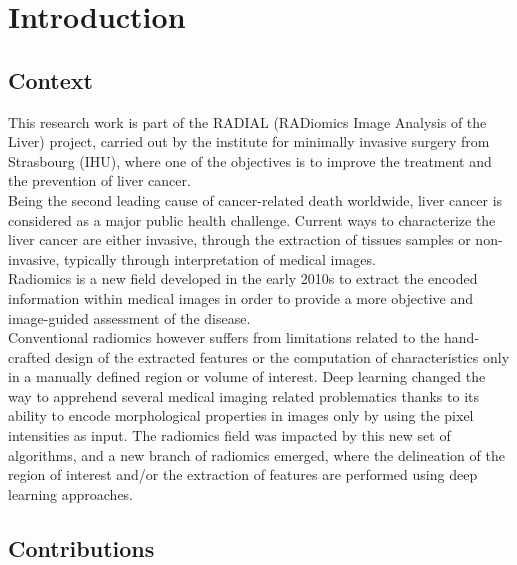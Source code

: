 \chapter*{Introduction}
\label{cha:Introduction}

\section*{Context}
\label{sec:Context}

This research work is part of the RADIAL (RADiomics Image Analysis of the Liver) project, carried out by the
institute for minimally invasive surgery from Strasbourg (IHU), where
one of the objectives is to improve the treatment and the prevention of
liver cancer.\\
Being the second leading cause of cancer-related death worldwide, liver
cancer is considered as a major public health challenge. Current ways to characterize the liver cancer are either invasive, 
through the extraction of tissues samples or non-invasive, typically 
through interpretation of medical images.\\
Radiomics is a new field developed in the early 2010s to extract the encoded information within medical images in order to provide a more objective and image-guided assessment of the disease.\\
Conventional radiomics however suffers from limitations related to the hand-crafted design of the extracted features or the computation of characteristics only in a manually defined region or volume of interest. Deep learning changed the way to apprehend several medical imaging related problematics thanks to its ability to encode
morphological properties in images only by using the pixel intensities
as input. The radiomics field was impacted by this new set of algorithms, and a new branch of radiomics emerged, where the delineation of the region of interest and/or the extraction of features are performed using deep learning approaches.

\section*{Contributions}
\label{sec:IntroContributions}

